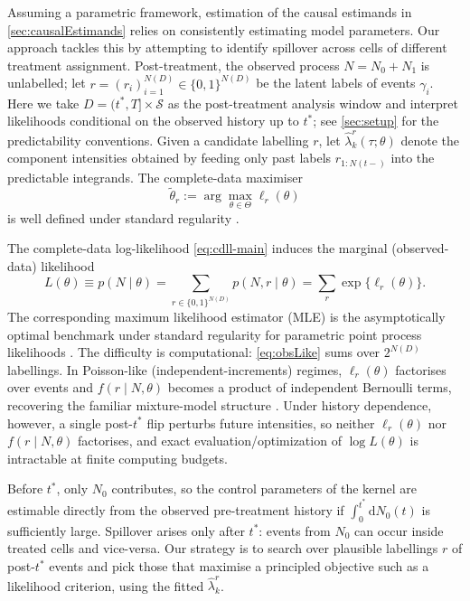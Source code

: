 \documentclass{statsoc}
\newcommand{\1}{\mathbbm{1}}
\newcommand{\Nproc}{N}
\newcommand{\Nzero}{N_0}
\newcommand{\None}{N_1}
\begin{document}
Assuming a parametric framework, estimation of the causal estimands in \cref{sec:causalEstimands} relies on consistently estimating model parameters. Our approach tackles this by attempting to identify spillover across cells of different treatment assignment. Post-treatment, the observed process \(\Nproc=\Nzero+\None\) is unlabelled; let \(r=(r_i)_{i=1}^{\Nproc(D)}\in\{0,1\}^{\Nproc(D)}\) be the latent labels of events \(\gamma_i\). Here we take \(D=(t^\ast,T]\times\mathcal S\) as the post-treatment analysis window and interpret likelihoods conditional on the observed history up to \(t^\ast\); see \cref{sec:setup} for the predictability conventions. Given a candidate labelling \(r\), let \(\widehat\lambda_k^r(\tau;\theta)\) denote the component intensities obtained by feeding only past labels \(r_{1:\Nproc(t-)}\) into the predictable integrands. The complete-data maximiser
\begin{equation}\label{eq:cdll-main}
\tilde\theta_r:=\arg\max_{\theta\in\Theta}\ell_r(\theta)
\end{equation}
is well defined under standard regularity \citep{ogata1978asymptotic,RATHBUN199655}.

The complete-data log-likelihood \eqref{eq:cdll-main} induces the marginal
(observed-data) likelihood
\begin{equation}\label{eq:obsLike}
L(\theta)\equiv p(\Nproc\mid \theta)
=\sum_{r\in\{0,1\}^{\Nproc(D)}} p(\Nproc,r\mid \theta)
=\sum_{r}\exp\{\ell_r(\theta)\}.
\end{equation}
The corresponding maximum likelihood estimator (MLE) is the asymptotically optimal benchmark under standard regularity for parametric point process likelihoods \citep{ogata1978asymptotic}. The difficulty is computational: \eqref{eq:obsLike} sums over \(2^{\Nproc(D)}\) labellings. In Poisson-like (independent-increments) regimes, \(\ell_r(\theta)\) factorises over events and \(f(r\mid \Nproc,\theta)\) becomes a product of independent Bernoulli terms, recovering the familiar mixture-model structure \citep{mclachlan2019finite}. Under history dependence, however, a single post-\(t^\ast\) flip perturbs future intensities, so neither \(\ell_r(\theta)\) nor \(f(r\mid \Nproc,\theta)\) factorises, and exact evaluation/optimization of \(\log L(\theta)\) is intractable at finite computing budgets.

Before \(t^\ast\), only \(\Nzero\) contributes, so the control parameters of the kernel are estimable directly from the observed pre-treatment history if \(\int_0^{t^\ast} \mathrm dN_0(t)\) is sufficiently large. Spillover arises only after \(t^\ast\): events from \(\Nzero\) can occur inside treated cells and vice-versa. Our strategy is to search over plausible labellings \(r\) of post-\(t^\ast\) events and pick those that maximise a principled objective such as a likelihood criterion, using the fitted \(\widehat\lambda_k^r\).
\end{document}
